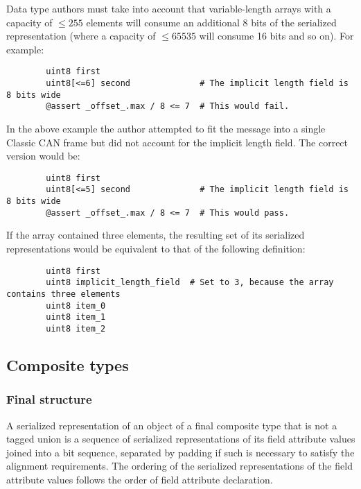 \begin{remark}
    Data type authors must take into account that variable-length arrays with a capacity of $\leq{}255$ elements will
    consume an additional 8 bits of the serialized representation
    (where a capacity of $\leq 65535$ will consume 16 bits and so on).
    For example:

    \begin{verbatim}
        uint8 first
        uint8[<=6] second              # The implicit length field is 8 bits wide
        @assert _offset_.max / 8 <= 7  # This would fail.
    \end{verbatim}

    In the above example the author attempted to fit the message into a single Classic CAN frame but
    did not account for the implicit length field. The correct version would be:

    \begin{verbatim}
        uint8 first
        uint8[<=5] second              # The implicit length field is 8 bits wide
        @assert _offset_.max / 8 <= 7  # This would pass.
    \end{verbatim}

    If the array contained three elements, the resulting set of its serialized representations would
    be equivalent to that of the following definition:

    \begin{verbatim}
        uint8 first
        uint8 implicit_length_field  # Set to 3, because the array contains three elements
        uint8 item_0
        uint8 item_1
        uint8 item_2
    \end{verbatim}
\end{remark}

\subsection{Composite types}\label{sec:dsdl_serialization_composite}

\subsubsection{Final structure}

A serialized representation of an object of a final composite type that is not a tagged union
is a sequence of serialized representations of its field attribute values joined into a bit sequence,
separated by padding if such is necessary to satisfy the alignment requirements.
The ordering of the serialized representations of the field attribute values follows the order
of field attribute declaration.

